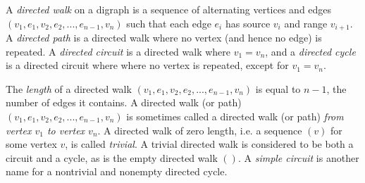 \documentclass[a4paper,11pt]{report}
\begin{document}
{{{ A \emph{directed walk} on a digraph is a sequence of alternating vertices and edges $(v_1, e_1, v_2, e_2, ..., e_{n-1}, v_n)$ such that each edge $e_i$ has source $v_i$ and range $v_{i+1}$. A \emph{directed path} is a directed walk where no vertex (and hence no edge) is repeated. A \emph{directed circuit} is a directed walk where $v_1 = v_n$, and a \emph{directed cycle} is a directed circuit where where no vertex is repeated, except for $v_1 = v_n$. 

 The \emph{length} of a directed walk $(v_1, e_1, v_2, e_2, ..., e_{n-1}, v_n)$ is equal to $n-1$, the number of edges it contains. A directed walk (or path) $(v_1, e_1, v_2, e_2, ..., e_{n-1}, v_n)$ is sometimes called a directed walk (or path) \emph{from vertex $v_1$ to vertex $v_n$}. A directed walk of zero length, i.e. a sequence $(v)$ for some vertex $v$, is called \emph{trivial}. A trivial directed walk is considered to be both a circuit and a cycle, as
is the empty directed walk $()$. A \emph{simple circuit} is another name for a non\texttt{}trivial and
non\texttt{}empty directed cycle.

 }

 }

 }

 
\end{document}
